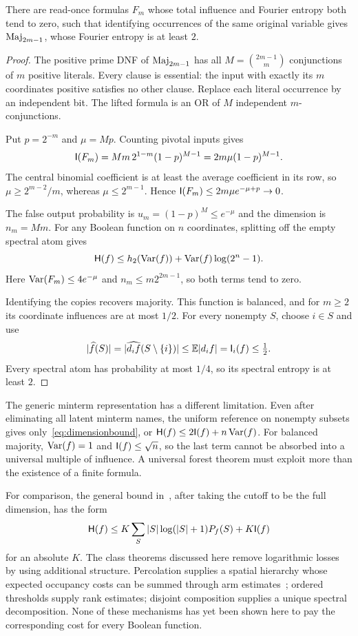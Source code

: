\begin{proposition}\label{prop:cloning}
There are read-once formulas $F_m$ whose total influence and Fourier entropy both tend to zero, such that identifying occurrences of the same original variable gives $\operatorname{Maj}_{2m-1}$, whose Fourier entropy is at least $2$.
\end{proposition}
\begin{proof}
The positive prime DNF of $\operatorname{Maj}_{2m-1}$ has all
$M=\binom{2m-1}{m}$ conjunctions of $m$ positive literals. Every clause is essential: the input with exactly its $m$ coordinates positive satisfies no other clause. Replace each literal occurrence by an independent bit. The lifted formula is an OR of $M$ independent $m$-conjunctions.

Put $p=2^{-m}$ and $\mu=Mp$. Counting pivotal inputs gives
\[
 \mathsf I(F_m)=M m\,2^{1-m}(1-p)^{M-1}
        =2m\mu(1-p)^{M-1}.
\]
The central binomial coefficient is at least the average coefficient in its row, so $\mu\ge2^{m-2}/m$, whereas $\mu\le2^{m-1}$. Hence $\mathsf I(F_m)\le2m\mu e^{-\mu+p}\to0$.

The false output probability is $u_m=(1-p)^M\le e^{-\mu}$ and the dimension is $n_m=Mm$. For any Boolean function on $n$ coordinates, splitting off the empty spectral atom gives
\begin{equation}\label{eq:dimensionbound}
 \mathsf H(f)\le h_2(\operatorname{Var}(f))+\operatorname{Var}(f)\log(2^n-1).
\end{equation}
Here $\operatorname{Var}(F_m)\le4e^{-\mu}$ and $n_m\le m2^{2m-1}$, so both terms tend to zero.

Identifying the copies recovers majority. This function is balanced, and for $m\ge2$ its coordinate influences are at most $1/2$. For every nonempty $S$, choose $i\in S$ and use
\[
 |\widehat{f}(S)|=|\widehat{d_i f}(S\setminus\{i\})|
 \le\mathbb E|d_i f|=\mathsf I_i(f)\le\tfrac12.
\]
Every spectral atom has probability at most $1/4$, so its spectral entropy is at least $2$.
\end{proof}

The generic minterm representation has a different limitation. Even after eliminating all latent minterm names, the uniform reference on nonempty subsets gives only~\eqref{eq:dimensionbound}, or $\mathsf H(f)\le2\mathsf I(f)+n\operatorname{Var}(f)$. For balanced majority, $\operatorname{Var}(f)=1$ and $\mathsf I(f)\le\sqrt n$, so the last term cannot be absorbed into a universal multiple of influence. A universal forest theorem must exploit more than the existence of a finite formula.

For comparison, the general bound in~\cite[Theorem 1.3]{KKLMS20}, after taking the cutoff to be the full dimension, has the form
\[
 \mathsf H(f)\le K\sum_S |S|\log(|S|+1)P_f(S)+K\mathsf I(f)
\]
for an absolute $K$. The class theorems discussed here remove logarithmic losses by using additional structure. Percolation supplies a spatial hierarchy whose expected occupancy costs can be summed through arm estimates~\cite{GPS10,Percolation}; ordered thresholds supply rank estimates; disjoint composition supplies a unique spectral decomposition. None of these mechanisms has yet been shown here to pay the corresponding cost for every Boolean function.

